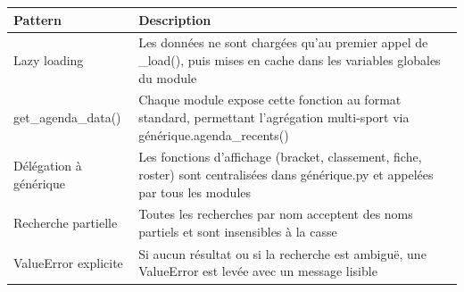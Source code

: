 \documentclass[12pt,a4paper]{article}
\begin{document}
\begin{center}
\begin{tabular}{>{\ttfamily}p{4.5cm} p{9cm}}
\toprule
\textbf{Pattern} & \textbf{Description} \\
\midrule
Lazy loading & Les données ne sont chargées qu'au premier appel de \_load(),
puis mises en cache dans les variables globales du module \\
get\_agenda\_data() & Chaque module expose cette fonction au format standard,
permettant l'agrégation multi-sport via générique.agenda\_recents() \\
Délégation à générique & Les fonctions d'affichage (bracket, classement, fiche,
roster) sont centralisées dans générique.py et appelées par tous les modules \\
Recherche partielle & Toutes les recherches par nom acceptent des noms partiels
et sont insensibles à la casse \\
ValueError explicite & Si aucun résultat ou si la recherche est ambiguë,
une ValueError est levée avec un message lisible \\
\bottomrule
\end{tabular}
\end{center}
\end{document}
